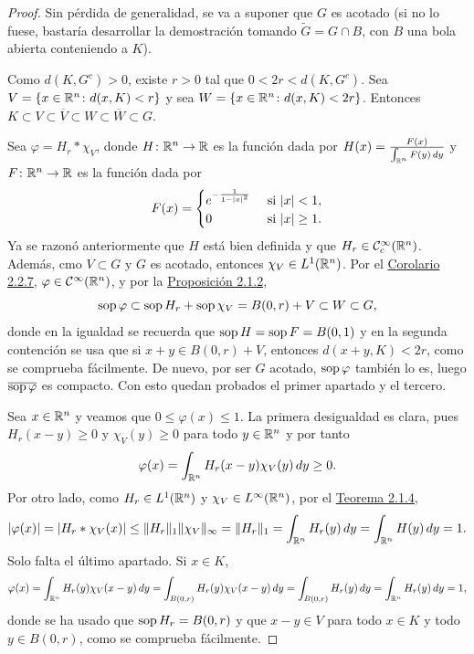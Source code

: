 \documentclass[a4paper, 11pt, oneside]{report}
\begin{document}
\begin{proof}
  Sin pérdida de generalidad, se va a suponer que $G$ es acotado (si no lo fuese, bastaría desarrollar la demostración tomando $\widetilde{G} = G \cap B$, con $B$ una bola abierta conteniendo a $K$).

  Como $d(K,G^c) > 0$, existe $r > 0$ tal que $0 < 2r < d(K,G^c)$. Sea $V = \{x \in \mathbb R^n \colon d(x,K)<r\}$ y sea $W = \{x \in \mathbb R^n \colon d(x,K) < 2r\}$. Entonces $K \subset V \subset \overline{V} \subset W \subset \overline{W} \subset G$.

  Sea $\varphi = H_r \ast \chi_V$, donde $H \colon \mathbb R^n \to \mathbb R$ es la función dada por $H(x)=\frac{F(x)}{\int_{\mathbb R^n} F(y) \, dy}$ y $F \colon \mathbb R^n \to \mathbb R$ es la función dada por
  \[F(x)=\begin{cases}
    e^{-\frac{1}{1-|x|^2}} & $ si $ |x| < 1, \\
    0 & $ si $ |x| \geq 1.
  \end{cases}\]
  Ya se razonó anteriormente que $H$ está bien definida y que $H_r \in \mathcal{C}^\infty_c(\mathbb R^n)$. Además, cmo $V \subset G$ y $G$ es acotado, entonces $\chi_V \in L^1(\mathbb R^n)$. Por el \hyperref[cor:2.2.7]{\color{c1}Corolario 2.2.7}, $\varphi \in \mathcal{C}^\infty(\mathbb R^n)$, y por la \hyperref[pro:2.1.2]{\color{c1}Proposición 2.1.2},
  \[\textup{sop}\, \varphi \subset \textup{sop}\, H_r + \textup{sop}\, \chi_V = B(0,r) + V \subset W \subset G,\]
  donde en la igualdad se recuerda que $\textup{sop}\, H = \textup{sop}\, F = B(0,1)$ y en la segunda contención se usa que si $x+y \in B(0,r)+V$, entonces $d(x+y,K) < 2r$, como se comprueba fácilmente. De nuevo, por ser $G$ acotado, $\textup{sop}\, \varphi$ también lo es, luego $\overline{\textup{sop}\, \varphi}$ es compacto. Con esto quedan probados el primer apartado y el tercero.

  Sea $x \in \mathbb R^n$ y veamos que $ 0 \leq \varphi(x) \leq 1$. La primera desigualdad es clara, pues $H_r(x-y) \geq 0$ y $\chi_V(y) \geq 0$ para todo $y \in \mathbb R^n$ y por tanto
  \[\varphi(x) = \int_{\mathbb R^n} H_r(x-y) \chi_V(y) \, dy \geq 0.\]
  Por otro lado, como $H_r \in L^1(\mathbb R^n)$ y $\chi_V \in L^\infty(\mathbb R^n)$, por el \hyperref[teo:2.1.4]{\color{c1}Teorema 2.1.4},
  \[|\varphi(x)| = |H_r \ast \chi_V(x)| \leq \|H_r\|_1 \|\chi_V\|_{\infty} = \|H_r\|_1 = \int_{\mathbb R^n} H_r(y) \, dy = \int_{\mathbb R^n} H(y) \, dy = 1.\]
  Solo falta el último apartado. Si $x \in K$,
  \[\begin{aligned}[t]
    \varphi(x) &= \int_{\mathbb R^n} H_r(y) \chi_V(x-y) \, dy = \int_{B(0,r)} H_r(y) \chi_V(x-y) \, dy = \int_{B(0,r)} H_r(y) \, dy =\int_{\mathbb R^n} H_r(y) \, dy = 1,\\
  \end{aligned}\]
  donde se ha usado que $\textup{sop}\, H_r = B(0,r)$ y que $x-y \in V$ para todo $x \in K$ y todo $y \in B(0,r)$, como se comprueba fácilmente.
\end{proof}
\end{document}

